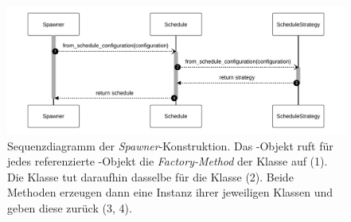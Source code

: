 \begin{figure}[!ht]
	\centering
	\includegraphics[width=1.0\linewidth]{images/diagrams/spawner-factory-seq.pdf}
	\caption{Sequenzdiagramm der \emph{Spawner}-Konstruktion. Das -Objekt ruft für jedes referenzierte -Objekt die \emph{Factory-Method} der Klasse  auf (1). Die Klasse  tut daraufhin dasselbe für die Klasse  (2). Beide Methoden erzeugen dann eine Instanz ihrer jeweiligen Klassen und geben diese zurück (3, 4).}
	\label{fig:spawner-factory-seq}
\end{figure}
